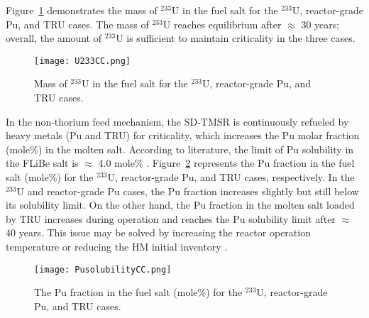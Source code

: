 Figure~\ref{fig:U233CC} demonstrates the mass of $^{233}$U in the fuel salt 
for the $^{233}$U, reactor-grade Pu, and TRU cases. The mass of 
$^{233}$U reaches equilibrium after $\approx$ $30$ years; overall, the 
amount of $^{233}$U is sufficient to maintain criticality in 
the three cases.
\begin{figure}
	\centering
	\texttt{[image: U233CC.png]}
	\caption{Mass of $^{233}$U in the fuel salt for the $^{233}$U, reactor-grade Pu, and TRU cases.}
	\label{fig:U233CC}
\end{figure}

In the non-thorium feed mechanism, the SD-TMSR is continuously refueled by heavy metals (Pu and TRU) for 
criticality, which increases the Pu molar fraction (mole\%) in the molten salt. 
According to literature, the limit of Pu solubility in the FLiBe salt is 
$\approx$ $4.0$ mole\% \cite{ignatiev2012progress,sood1975plutonium}. 
Figure~\ref{fig:PusolubilityCC} represents the Pu fraction in the fuel salt 
(mole\%) for the $^{233}$U, reactor-grade Pu, and TRU cases, respectively. In the $^{233}$U and reactor-grade Pu cases, the Pu fraction increases 
slightly but still below its solubility limit. On the other hand, the Pu 
fraction in the molten salt loaded by TRU increases during operation and 
reaches the Pu solubility limit after $\approx$ $40$ years. This issue may 
be solved by increasing the reactor operation temperature or reducing the 
HM initial inventory \cite{zou2018transition}.
\begin{figure}
	\centering
	\texttt{[image: PusolubilityCC.png]}
	\caption{The Pu fraction in the fuel salt (mole\%) for the $^{233}$U, reactor-grade Pu, and TRU cases.}
	\label{fig:PusolubilityCC}
\end{figure}
\FloatBarrier

